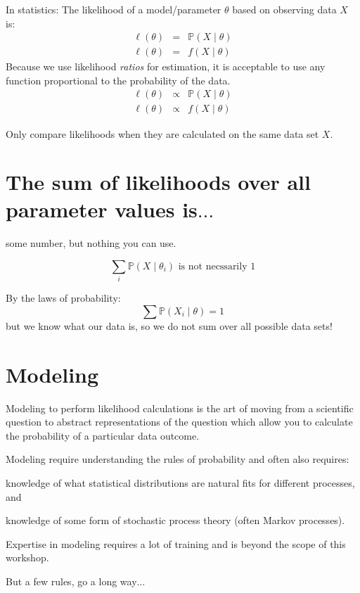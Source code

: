 \documentclass[landscape]{foils}
\renewcommand{\Pr}{\mathbb{P}}
\begin{document}
In statistics:
The likelihood of a model/parameter $\theta$ based on observing data $X$ is:
\begin{eqnarray*}
  \ell(\theta) & = & \Pr(X \mid \theta) \\
  \ell(\theta) & = & f(X \mid \theta)
\end{eqnarray*}
Because we use likelihood {\em ratios} for estimation, it is acceptable
to use any function proportional to the probability of the data.
\begin{eqnarray*}
  \ell(\theta) & \propto & \Pr(X \mid \theta) \\
  \ell(\theta) & \propto & f(X \mid \theta)
\end{eqnarray*}

Only compare likelihoods when they are calculated on the same data set $X$.

\myNewSlide
\section*{The sum of likelihoods over all parameter values is$\ldots$}
some number, but nothing you can use.

$$\sum_i \Pr(X \mid \theta_i) \mbox{ is not necssarily } 1$$


By the laws of probability:
$$\sum \Pr(X_i \mid \theta) = 1$$
but we know what our data is, so we do not sum over all possible data sets!

\myNewSlide
\section*{Modeling}
Modeling to perform likelihood calculations is the art of moving from a 
scientific question to abstract representations of the question which
allow you to calculate the probability of a particular data outcome.

Modeling require understanding the rules of probability and often also requires:
\begin{compactitem}
  \item knowledge of what statistical distributions are natural fits for different processes, and
  \item knowledge of some form of stochastic process theory (often Markov processes).
\end{compactitem}
Expertise in modeling requires a lot of training and is beyond the scope of this workshop.

But a few rules, go a long way$\ldots$

\myNewSlide
\end{document}

